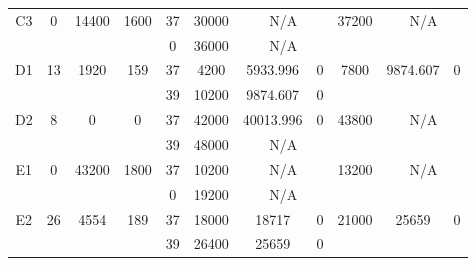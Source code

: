 \begin{sidewaystable}
\begin{tabular}{c||c|c|c||c|c|c|c||c|c|c}
         &
        
      \\
      \hline
      \multirow{2}{*}{C3} &
      \multirow{2}{*}{0} &
      \multirow{2}{*}{14400} &
      \multirow{2}{*}{1600} &
      37 &
      30000 &
        \multicolumn{2}{|c||}{N/A} &
      \multirow{2}{*}{37200} &
        \multicolumn{2}{c}{\multirow{2}{*}{N/A}}
      \\
      \cline{5-8}
       &
       &
       &
       &
      0 &
      36000 &
        \multicolumn{2}{|c||}{N/A} &
      
        
      \\
      \hline
      \multirow{2}{*}{D1} &
      \multirow{2}{*}{13} &
      \multirow{2}{*}{1920} &
      \multirow{2}{*}{159} &
      37 &
      4200 &
        5933.996 &
        0 &
      \multirow{2}{*}{7800} &
        \multirow{2}{*}{9874.607} &
        \multirow{2}{*}{0}
      \\
      \cline{5-8}
       &
       &
       &
       &
      39 &
      10200 &
        9874.607 &
        0 &
      
         &
        
      \\
      \hline
      \multirow{2}{*}{D2} &
      \multirow{2}{*}{8} &
      \multirow{2}{*}{0} &
      \multirow{2}{*}{0} &
      37 &
      42000 &
        40013.996 &
        0 &
      \multirow{2}{*}{43800} &
        \multicolumn{2}{c}{\multirow{2}{*}{N/A}}
      \\
      \cline{5-8}
       &
       &
       &
       &
      39 &
      48000 &
        \multicolumn{2}{|c||}{N/A} &
      
        
      \\
      \hline
      \multirow{2}{*}{E1} &
      \multirow{2}{*}{0} &
      \multirow{2}{*}{43200} &
      \multirow{2}{*}{1800} &
      37 &
      10200 &
        \multicolumn{2}{|c||}{N/A} &
      \multirow{2}{*}{13200} &
        \multicolumn{2}{c}{\multirow{2}{*}{N/A}}
      \\
      \cline{5-8}
       &
       &
       &
       &
      0 &
      19200 &
        \multicolumn{2}{|c||}{N/A} &
      
        
      \\
      \hline
      \multirow{2}{*}{E2} &
      \multirow{2}{*}{26} &
      \multirow{2}{*}{4554} &
      \multirow{2}{*}{189} &
      37 &
      18000 &
        18717 &
        0 &
      \multirow{2}{*}{21000} &
        \multirow{2}{*}{25659} &
        \multirow{2}{*}{0}
      \\
      \cline{5-8}
       &
       &
       &
       &
      39 &
      26400 &
        25659 &
        0 &
      

\end{tabular}
\end{sidewaystable}
